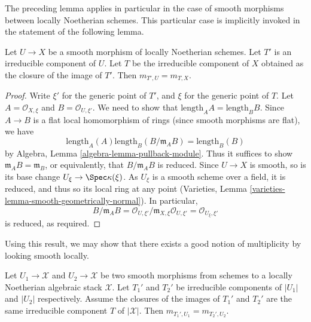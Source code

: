 \noindent
The preceding lemma applies in particular in the case of smooth morphisms
between locally Noetherian schemes. This particular case is
implicitly invoked in the statement of the following lemma.

\begin{lemma}
\label{lemma-multiplicities}
Let $U \to X$ be a smooth morphism of locally Noetherian schemes.
Let $T'$ is an irreducible component of $U$. Let $T$ be the
irreducible component of $X$ obtained as the closure of the
image of $T'$. Then $m_{T', U} = m_{T, X}$.
\end{lemma}

\begin{proof}
Write $\xi'$ for the generic point of $T'$, and $\xi$ for the
generic point of $T$. Let $A = \mathcal{O}_{X, \xi}$ and
$B = \mathcal{O}_{U, \xi'}$. We need to show that
$\text{length}_A A = \text{length}_B B$. Since
$A \to B$ is a flat local homomorphism of rings
(since smooth morphisms are flat), we have
$$
\text{length}_A(A) \text{length}_B(B/\mathfrak m_A B) =
\text{length}_B(B)
$$
by Algebra, Lemma \ref{algebra-lemma-pullback-module}. Thus it suffices
to show $\mathfrak m_A B = \mathfrak m_B$, or equivalently, that
$B/\mathfrak m_A B$ is reduced. Since $U \to X$ is smooth,
so is its base change $U_{\xi} \to \Spec \kappa(\xi)$. As $U_{\xi}$ is a
smooth scheme over a field, it is reduced, and thus so its local ring
at any point
(Varieties, Lemma \ref{varieties-lemma-smooth-geometrically-normal}).
In particular,
$$
B/\mathfrak m_A B =
\mathcal{O}_{U, \xi'}/\mathfrak m_{X, \xi}\mathcal{O}_{U, \xi'} =
\mathcal{O}_{U_\xi, \xi'}
$$
is reduced, as required.
\end{proof}

\noindent
Using this result, we may show that there exists a good notion
of multiplicity by looking smooth locally.

\begin{lemma}
\label{lemma-multiplicity}
Let $U_1 \to \mathcal{X}$ and $U_2 \to \mathcal{X}$ be two smooth
morphisms from schemes to a locally Noetherian algebraic stack $\mathcal{X}$.
Let $T_1'$ and $T_2'$ be irreducible components of $|U_1|$
and $|U_2|$ respectively. Assume the closures of the images of
$T_1'$ and $T_2'$ are the same irreducible component $T$ of $|\mathcal{X}|$.
Then $m_{T_1', U_1} = m_{T_2', U_2}$.
\end{lemma}

